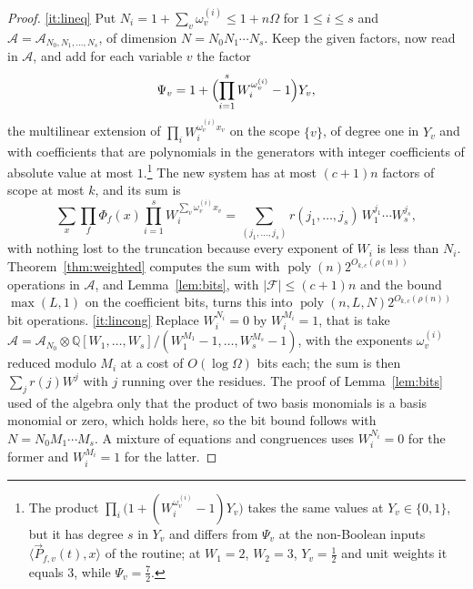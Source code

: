 \documentclass[11pt,reqno]{amsart}
\numberwithin{equation}{section}
\theoremstyle{plain}
\theoremstyle{definition}
\theoremstyle{remark}
\DeclareMathOperator{\poly}{poly}
\newcommand{\A}{\mathcal{A}}
\newcommand{\F}{\mathcal{F}}
\newcommand{\Q}{\mathbb{Q}}
\newcommand{\PP}{\vec{P}}
\newcommand{\rhon}{\rho}
\newcommand{\ip}[2]{\langle #1,#2\rangle}
\begin{document}
\begin{proof}
\ref{it:lineq} Put $N_i=1+\sum_v\omega^{(i)}_v\le 1+n\Omega$ for $1\le i\le s$ and
$\A=\A_{N_0,N_1,\dots,N_s}$, of dimension $N=N_0N_1\cdots N_s$. Keep the given
factors, now read in $\A$, and add for each variable $v$ the factor
\[
  \Psi_v=1+\Bigl(\prod_{i=1}^{s}W_i^{\omega^{(i)}_v}-1\Bigr)Y_v ,
\]
the multilinear extension of $\prod_iW_i^{\omega^{(i)}_vx_v}$ on the scope
$\{v\}$, of degree one in $Y_v$ and with coefficients that are polynomials in
the generators with integer coefficients of absolute value at most
$1$.\footnote{The product $\prod_i\bigl(1+(W_i^{\omega^{(i)}_v}-1)Y_v\bigr)$ takes
the same values at $Y_v\in\{0,1\}$, but it has degree $s$ in $Y_v$ and differs from
$\Psi_v$ at the non-Boolean inputs $\ip{\PP_{f,v}(t)}{x}$ of the routine; at
$W_1=2$, $W_2=3$, $Y_v=\frac12$ and unit weights it equals $3$, while $\Psi_v=\frac72$.} The new
system has at most $(c+1)n$ factors of scope at most $k$, and its sum is
\[
  \sum_x\prod_f\Phi_f(x)\prod_{i=1}^{s}W_i^{\sum_v\omega^{(i)}_vx_v}
  =\sum_{(j_1,\dots,j_s)}r(j_1,\dots,j_s)\,W_1^{j_1}\cdots W_s^{j_s},
\]
with nothing lost to the truncation because every exponent of $W_i$ is less than
$N_i$. Theorem~\ref{thm:weighted} computes the sum with
$\poly(n)2^{O_{k,c}(\rhon(n))}$ operations in $\A$, and Lemma~\ref{lem:bits},
with $|\F|\le(c+1)n$ and the bound $\max(L,1)$ on the coefficient bits, turns
this into $\poly(n,L,N)2^{O_{k,c}(\rhon(n))}$ bit operations.
\ref{it:lincong} Replace $W_i^{N_i}=0$ by $W_i^{M_i}=1$, that is take
$\A=\A_{N_0}\otimes\Q[W_1,\dots,W_s]/(W_1^{M_1}-1,\dots,W_s^{M_s}-1)$, with the
exponents $\omega^{(i)}_v$ reduced modulo $M_i$ at a cost of $O(\log\Omega)$ bits
each; the sum is then $\sum_jr(j)W^{j}$ with $j$ running over the residues. The
proof of Lemma~\ref{lem:bits} used of the algebra only that the product of two
basis monomials is a basis monomial or zero, which holds here, so the bit bound
follows with $N=N_0M_1\cdots M_s$. A mixture of equations and congruences uses
$W_i^{N_i}=0$ for the former and $W_i^{M_i}=1$ for the latter.
\end{proof}
\end{document}

